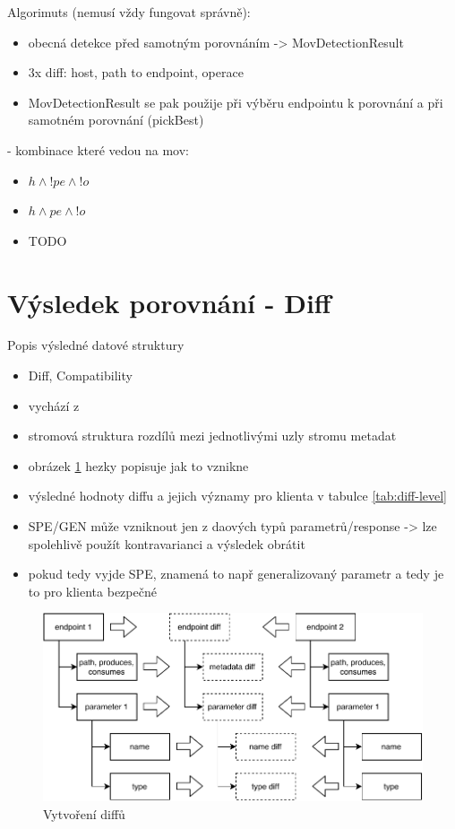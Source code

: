 \documentclass[czech,DP]{thesiskiv}
\begin{document}
Algorimuts (nemusí vždy fungovat správně):
\begin{itemize}
	\item  obecná detekce před samotným porovnáním -> MovDetectionResult
	\item  3x diff: host, path to endpoint, operace
	\item  MovDetectionResult se pak použije při výběru endpointu k porovnání a při samotném porovnání (pickBest)
\end{itemize}
	
- kombinace které vedou na mov: 
\begin{itemize}
	\item $h \land !pe \land !o$
	\item $h \land pe \land !o$
	\item TODO
\end{itemize}
	
	
\section{Výsledek porovnání - Diff}	
Popis výsledné datové struktury
\begin{itemize}
	\item Diff, Compatibility
	\item vychází z \cite{brada2006diff}
	\item stromová struktura rozdílů mezi jednotlivými uzly stromu metadat
	\item obrázek \ref{fig:diff-construction} hezky popisuje jak to vznikne
	\item výsledné hodnoty diffu a jejich významy pro klienta v tabulce \ref{tab:diff-level}
	\item SPE/GEN může vzniknout jen z daových typů parametrů/response -> lze spolehlivě použít kontravarianci a výsledek obrátit
	\item pokud tedy vyjde SPE, znamená to např generalizovaný parametr a tedy je to pro klienta bezpečné
\end{itemize}
	
\begin{figure}[h]
	\centering
	\includegraphics{diff-construction}
	\caption{Vytvoření diffů}
	\label{fig:diff-construction}
\end{figure}
\end{document}
